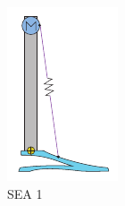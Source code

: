 \begin{figure}[hb!]
\label{fig:compliance}
  \begin{subfigure}{.19\textwidth}
    \centering
    \includegraphics[width=\linewidth]{figures/illustration_serial_direct_i.pdf}
    \caption{SEA 1}
    \label{fig:series1}
  \end{subfigure}
  \begin{subfigure}{.19\textwidth}
    \centering

\end{subfigure}
\end{figure}
